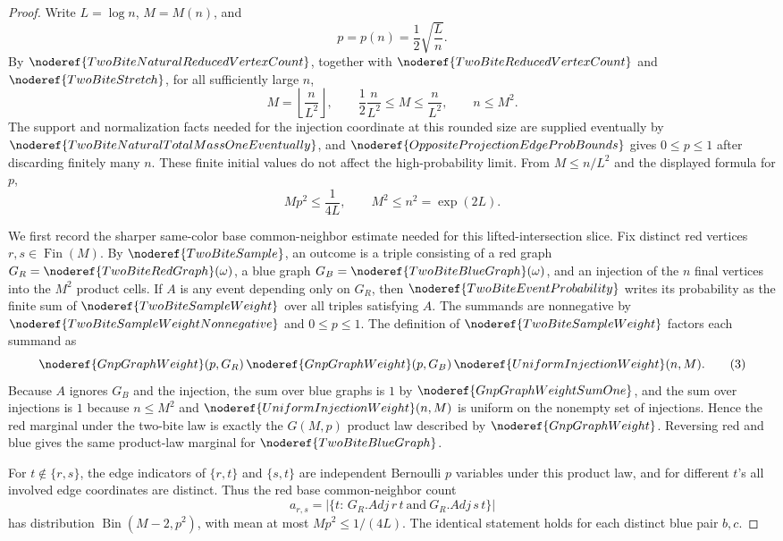 \begin{proof}
Write \(L=\log n\), \(M=M(n)\), and
\[
p=p(n)=\frac12\sqrt{\frac{L}{n}}.
\]
By \(\noderef{TwoBiteNaturalReducedVertexCount}\), together with
\(\noderef{TwoBiteReducedVertexCount}\) and \(\noderef{TwoBiteStretch}\), for
all sufficiently large \(n\),
\[
M=\left\lfloor\frac n{L^2}\right\rfloor,\qquad
\frac12\frac n{L^2}\le M\le\frac n{L^2},\qquad n\le M^2.
\tag{1}
\]
The support and normalization facts needed for the injection coordinate at
this rounded size are supplied eventually by
\(\noderef{TwoBiteNaturalTotalMassOneEventually}\), and
\(\noderef{OppositeProjectionEdgeProbBounds}\) gives \(0\le p\le1\) after
discarding finitely many \(n\).  These finite initial values do not affect
the high-probability limit.  From \(M\le n/L^2\) and the displayed formula
for \(p\),
\[
Mp^2\le \frac1{4L},\qquad M^2\le n^2=\exp(2L).
\tag{2}
\]

We first record the sharper same-color base common-neighbor estimate needed
for this lifted-intersection slice.  Fix distinct red vertices
\(r,s\in\operatorname{Fin}(M)\).  By \(\noderef{TwoBiteSample}\), an outcome
is a triple consisting of a red graph \(G_R=\noderef{TwoBiteRedGraph}(\omega)\),
a blue graph \(G_B=\noderef{TwoBiteBlueGraph}(\omega)\), and an injection of
the \(n\) final vertices into the \(M^2\) product cells.  If \(A\) is any
event depending only on \(G_R\), then
\(\noderef{TwoBiteEventProbability}\) writes its probability as the finite
sum of \(\noderef{TwoBiteSampleWeight}\) over all triples satisfying \(A\).
The summands are nonnegative by \(\noderef{TwoBiteSampleWeightNonnegative}\)
and \(0\le p\le1\).  The definition of
\(\noderef{TwoBiteSampleWeight}\) factors each summand as
\[
\noderef{GnpGraphWeight}(p,G_R)\,
\noderef{GnpGraphWeight}(p,G_B)\,
\noderef{UniformInjectionWeight}(n,M).
\tag{3}
\]
Because \(A\) ignores \(G_B\) and the injection, the sum over blue graphs is
\(1\) by \(\noderef{GnpGraphWeightSumOne}\), and the sum over injections is
\(1\) because \(n\le M^2\) and
\(\noderef{UniformInjectionWeight}(n,M)\) is uniform on the nonempty set of
injections.  Hence the red marginal under the two-bite law is exactly the
\(G(M,p)\) product law described by \(\noderef{GnpGraphWeight}\).  Reversing
red and blue gives the same product-law marginal for
\(\noderef{TwoBiteBlueGraph}\).

For \(t\notin\{r,s\}\), the edge indicators of \(\{r,t\}\) and \(\{s,t\}\)
are independent Bernoulli \(p\) variables under this product law, and for
different \(t\)'s all involved edge coordinates are distinct.  Thus the red
base common-neighbor count
\[
a_{r,s}=\left|\{t:\,G_R.Adj\,r\,t\ \text{and}\ G_R.Adj\,s\,t\}\right|
\]
has distribution \(\operatorname{Bin}(M-2,p^2)\), with mean at most
\(Mp^2\le 1/(4L)\).  The identical statement holds for each distinct blue
pair \(b,c\).


\end{proof}
